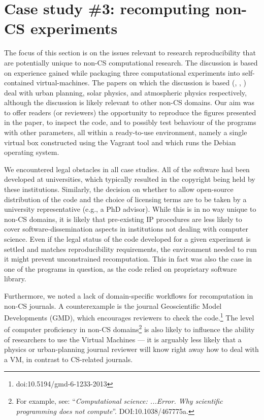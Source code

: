 \section{Case study \#3: recomputing non-CS experiments}
\label{s:group3}

The focus of this section is on the issues relevant to research reproducibility that are potentially unique to non-CS computational research.
The discussion is based on experience gained while packaging three computational experiments into self-contained virtual-machines.
The papers on which the discussion is based (\cite{danielpaper}, \cite{michaelpaper}, \cite{sylesterpaper}) deal with urban planning, solar physics, and atmospheric physics respectively, although the discussion is likely relevant to other non-CS domains.
Our aim was to offer readers (or reviewers) the opportunity to reproduce the figures presented in the paper, to inspect the code, and to possibly test behaviour of the programs with other parameters, all within a ready-to-use environment, namely a single virtual box constructed using the Vagrant tool and which runs the Debian operating system.

%
We encountered legal obstacles in all case studies.
All of the software had been developed at universities, which typically resulted in the copyright being held by these institutions.
Similarly, the decision on whether to allow open-source distribution of the code and the choice of licensing terms are to be taken by a university representative (e.g., a PhD advisor).
While this is in no way unique to non-CS domains, it is likely that pre-existing IP procedures are less likely to cover software-dissemination aspects in institutions not dealing with computer science.
Even if the legal status of the code developed for a given experiment is settled and matches reproducibility requirements, the environment needed to run it might prevent unconstrained recomputation.
This in fact was also the case in one of the programs in question, as the code relied on proprietary software library.

Furthermore, we noted a lack of domain-specific workflows for recomputation in non-CS journals.
A counterexample is the journal Geoscientific Model Developments (GMD), which encourages reviewers to check the code.\footnote{doi:10.5194/gmd-6-1233-2013 }
The level of computer proficiency in non-CS domains\footnote{For example, see: ``\emph{Computational science: ...Error. Why scientific programming does not compute}''. DOI:10.1038/467775a.} is also likely to influence the ability of researchers to use the Virtual Machines --- it is arguably less likely that a physics or urban-planning journal reviewer will know right away how to deal with a VM, in contrast to CS-related journals.

